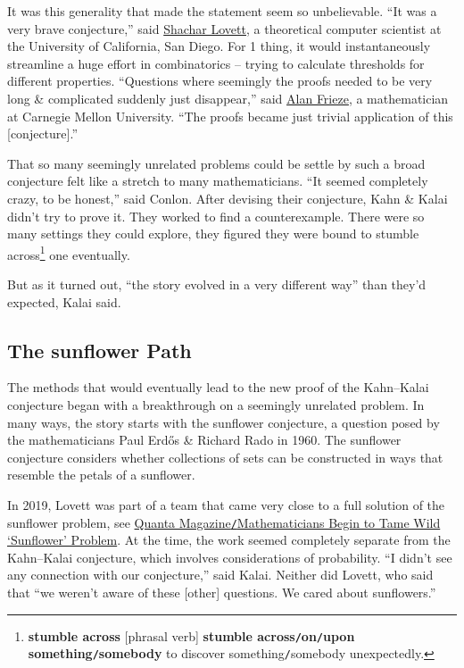 \documentclass[oneside]{book}
\numberwithin{equation}{section}
\begin{document}
It was this generality that made the statement seem so unbelievable. ``It was a very brave conjecture,'' said \href{https://cseweb.ucsd.edu/~slovett/home.html}{Shachar Lovett}, a theoretical computer scientist at the University of California, San Diego. For 1 thing, it would instantaneously streamline a huge effort in combinatorics -- trying to calculate thresholds for different properties. ``Questions where seemingly the proofs needed to be very long \& complicated suddenly just disappear,'' said \href{https://www.math.cmu.edu/~af1p/}{Alan Frieze}, a mathematician at Carnegie Mellon University. ``The proofs became just trivial application of this [conjecture].''

That so many seemingly unrelated problems could be settle by such a broad conjecture felt like a stretch to many mathematicians. ``It seemed completely crazy, to be honest,'' said Conlon. After devising their conjecture, Kahn \& Kalai didn't try to prove it. They worked to find a counterexample. There were so many settings they could explore, they figured they were bound to stumble across\footnote{\textbf{stumble across} [phrasal verb] \textbf{stumble across\texttt{/}on\texttt{/}upon something\texttt{/}somebody} to discover something\texttt{/}somebody unexpectedly.} one eventually.

But as it turned out, ``the story evolved in a very different  way'' than they'd expected, Kalai said.

\subsection{The sunflower Path}
The methods that would eventually lead to the new proof of the Kahn--Kalai conjecture began with a breakthrough on a seemingly unrelated problem. In many ways, the story starts with the sunflower conjecture, a question posed by the mathematicians Paul Erdős \& Richard Rado in 1960. The sunflower conjecture considers whether collections of sets can be constructed in ways that resemble the petals of a sunflower.

In 2019, Lovett was part of a team that came very close to a full solution of the sunflower problem, see \href{https://www.quantamagazine.org/mathematicians-begin-to-tame-wild-sunflower-problem-20191021/}{Quanta Magazine\texttt{/}Mathematicians Begin to Tame Wild `Sunflower' Problem}. At the time, the work seemed completely separate from the Kahn--Kalai conjecture, which involves considerations of probability. ``I didn't see any connection with our conjecture,'' said Kalai. Neither did Lovett, who said that ``we weren't aware of these [other] questions. We cared about sunflowers.''
\end{document}
